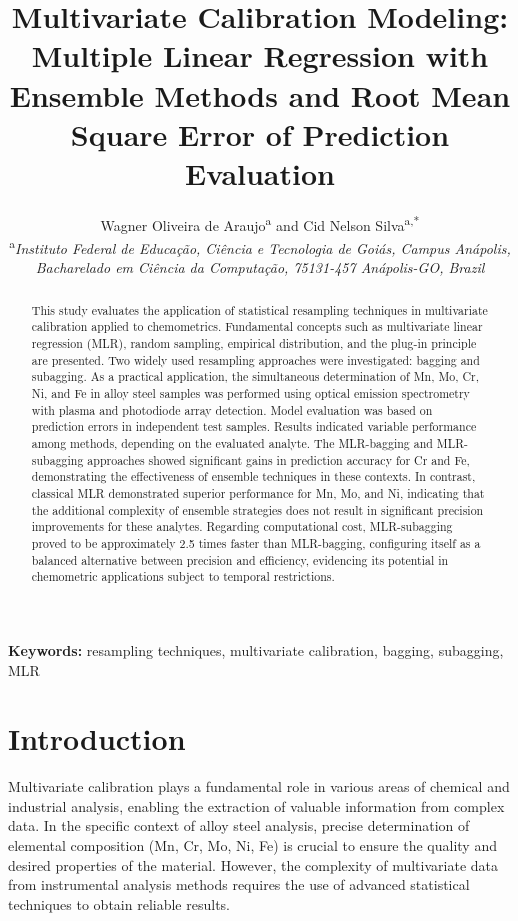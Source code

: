 \documentclass[12pt]{article}
\title{\textbf{Multivariate Calibration Modeling: Multiple Linear Regression with Ensemble Methods and Root Mean Square Error of Prediction Evaluation}}
\author{
Wagner Oliveira de Araujo\textsuperscript{a} and Cid Nelson Silva\textsuperscript{a,*}\\
\textsuperscript{a}\textit{Instituto Federal de Educação, Ciência e Tecnologia de Goiás, Campus Anápolis,}\\
\textit{Bacharelado em Ciência da Computação, 75131-457 Anápolis-GO, Brazil}
}
\date{}
\begin{document}
\maketitle

\begin{abstract}
This study evaluates the application of statistical resampling techniques in multivariate calibration applied to chemometrics. Fundamental concepts such as multivariate linear regression (MLR), random sampling, empirical distribution, and the plug-in principle are presented. Two widely used resampling approaches were investigated: bagging and subagging. As a practical application, the simultaneous determination of Mn, Mo, Cr, Ni, and Fe in alloy steel samples was performed using optical emission spectrometry with plasma and photodiode array detection. Model evaluation was based on prediction errors in independent test samples. Results indicated variable performance among methods, depending on the evaluated analyte. The MLR-bagging and MLR-subagging approaches showed significant gains in prediction accuracy for Cr and Fe, demonstrating the effectiveness of ensemble techniques in these contexts. In contrast, classical MLR demonstrated superior performance for Mn, Mo, and Ni, indicating that the additional complexity of ensemble strategies does not result in significant precision improvements for these analytes. Regarding computational cost, MLR-subagging proved to be approximately 2.5 times faster than MLR-bagging, configuring itself as a balanced alternative between precision and efficiency, evidencing its potential in chemometric applications subject to temporal restrictions.
\end{abstract}

\textbf{Keywords:} resampling techniques, multivariate calibration, bagging, subagging, MLR

\section{Introduction}

Multivariate calibration plays a fundamental role in various areas of chemical and industrial analysis, enabling the extraction of valuable information from complex data. In the specific context of alloy steel analysis, precise determination of elemental composition (Mn, Cr, Mo, Ni, Fe) is crucial to ensure the quality and desired properties of the material. However, the complexity of multivariate data from instrumental analysis methods requires the use of advanced statistical techniques to obtain reliable results.\cite{SKOOG:1997}
\end{document}
